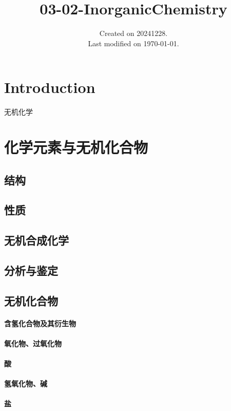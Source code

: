 \documentclass[UTF8]{../03-Chemistry}
\begin{document}
\title{03-02-InorganicChemistry}
\date{Created on 20241228.\\   Last modified on \today.}
\maketitle
\tableofcontents


\chapter{Introduction}

无机化学



\chapter{化学元素与无机化合物}
\section{结构}
\section{性质}
\section{无机合成化学}
\section{分析与鉴定}
\section{无机化合物}
    \subsubsection{含氢化合物及其衍生物}
    \subsubsection{氧化物、过氧化物}
    \subsubsection{酸}
    \subsubsection{氢氧化物、碱}
    \subsubsection{盐}
\end{document}
